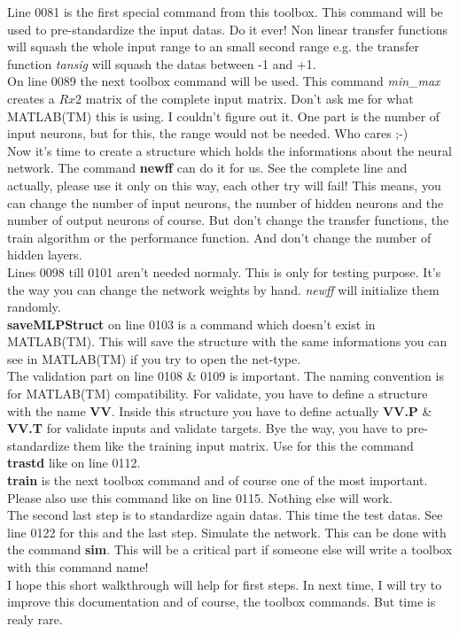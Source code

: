 Line 0081 is the first special command from this toolbox. This command will be used to pre-standardize the input datas. Do it ever! Non linear transfer functions will squash the whole input range to an small second range e.g. the transfer function \textit{tansig} will squash the datas between -1 and +1.\\

On line 0089 the next toolbox command will be used. This command \textit{min\_max} creates a $Rx2$ matrix of the complete input matrix. Don't ask me for what MATLAB(TM) this is using. I couldn't figure out it. One part is the number of input neurons, but for this, the range would not be needed. Who cares ;-)\\

Now it's time to create a structure which holds the informations about the neural network. The command \textbf{newff} can do it for us. See the complete line and actually, please use it only on this way, each other try will fail! This means, you can change the number of input neurons, the number of hidden neurons and the number of output neurons of course. But don't change the transfer functions, the train algorithm or the performance function. And don't change the number of hidden layers.\\

Lines 0098 till 0101 aren't needed normaly. This is only for testing purpose. It's the way you can change the network weights by hand. \textit{newff} will initialize them randomly.\\

\textbf{saveMLPStruct} on line 0103 is a command which doesn't exist in MATLAB(TM). This will save the structure with the same informations you can see in MATLAB(TM) if you try to open the net-type.\\

The validation part on line 0108 \& 0109 is important. The naming convention is for MATLAB(TM) compatibility. For validate, you have to define a structure with the name \textbf{VV}. Inside this structure you have to define actually \textbf{VV.P} \& \textbf{VV.T} for validate inputs and validate targets. Bye the way, you have to pre-standardize them like the training input matrix. Use for this the command \textbf{trastd} like on line 0112.\\

\textbf{train} is the next toolbox command and of course one of the most important. Please also use this command like on line 0115. Nothing else will work.\\

The second last step is to standardize again datas. This time the test datas. See line 0122 for this and the last step. Simulate the network. This can be done with the command \textbf{sim}. This will be a critical part if someone else will write a toolbox with this command name!\\

I hope this short walkthrough will help for first steps. In next time, I will try to improve this documentation and of course, the toolbox commands. But time is realy rare.



